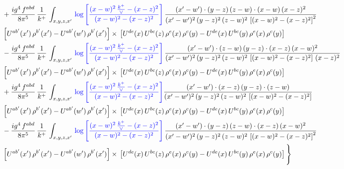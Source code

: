 \documentclass[10pt]{article}
\numberwithin{equation}{section}
\newcommand{\new}[1]{{\color{blue}#1}}
\begin{document}
\begin{align}
& +\frac{ig^{4}\, f^{abd}}{8\pi^{5}}\, \frac{1}{k^{+}}\, \int_{x,y,z,x'}\,\new{\log{\left[\frac{(x-w)^{2}\,\frac{k^{+}}{\vee}-(x-z)^{2}}{(x-w)^{2}-(x-z)^{2}}\right]}}\,\frac{(x'-w')\cdot  (y-z)\, (z-w)\cdot (x-w)\, (x-z)^{2}}{(x'-w')^{2}\, (y-z)^{2}\, (z-w)^{2}\,\left[(x-w)^{2}-(x-z)^{2}\right]^{2}}\, \notag \\ & \left[U^{ab'}(x')\,\rho^{b'}(x')-U^{ab'}(w')\, \rho^{b'}(x')\right]\times\,\left[U^{de}(x)\,U^{bc}(z)\, \rho^{e}(x)\,\rho^{c}(y)-U^{de}(x)\,U^{bc}(y)\,\rho^{e}(x)\,\rho^{c}(y)\right] \notag \\
& - \frac{ig^{4}\, f^{abd}}{8\pi^{5}}\, \frac{1}{k^{+}}\, \int_{x,y,z,x'}\,\new{\log{\left[\frac{(x-w)^{2}\,\frac{k^{+}}{\vee}-(x-z)^{2}}{(x-w)^{2}-(x-z)^{2}}\right]}}\,\frac{(x'-w')\cdot (z-w)\, (y-z)\cdot (x-z)\, (x-w)^{2}}{(x'-w')^{2}\, (y-z)^{2}\, (z-w)^{2}\,\left[(x-w)^{2} - (x-z)^{2}\right]\, (x-z)^{2}}\, \notag \\ & \left[U^{ab'}(x')\,\rho^{b'}(x')-U^{ab'}(w')\, \rho^{b'}(x')\right]\times\,\left[U^{de}(x)\,U^{bc}(z)\, \rho^{e}(x)\,\rho^{c}(y)-U^{de}(x)\,U^{bc}(y)\,\rho^{e}(x)\,\rho^{c}(y)\right] \notag \\
& +\frac{ig^{4}\, f^{abd}}{8\pi^{5}}\, \frac{1}{k^{+}}\, \int_{x,y,z,x'}\,\new{\log{\left[\frac{(x-w)^{2}\,\frac{k^{+}}{\vee}-(x-z)^{2}}{(x-w)^{2}-(x-z)^{2}}\right]}}\frac{(x'-w')\cdot (x-z)\, (y-z)\cdot (z-w)}{(x'-w')^{2}\, (y-z)^{2}\, (z-w)^{2}\,\left[(x-w)^{2} -(x-z)^{2}\right]}\, \notag \\ & \left[U^{ab'}(x')\,\rho^{b'}(x')-U^{ab'}(w')\, \rho^{b'}(x')\right]\times\,\left[U^{de}(x)\,U^{bc}(z)\, \rho^{e}(x)\,\rho^{c}(y)-U^{de}(x)\,U^{bc}(y)\,\rho^{e}(x)\,\rho^{c}(y)\right] \notag \\
& -\frac{ig^{4}\, f^{abd}}{8\pi^{5}}\, \frac{1}{k^{+}}\, \int_{x,y,z,x'}\,\new{\log{\left[\frac{(x-w)^{2}\,\frac{k^{+}}{\vee}-(x-z)^{2}}{(x-w)^{2}-(x-z)^{2}}\right]}}\,\frac{(x'-w')\cdot (y-z)\, (z-w)\cdot (x-z)\,(x-w)^{2}}{(x'-w')^{2}\, (y-z)^{2}\, (z-w)^{2}\,\left[(x-w)^{2}-(x-z)^{2}\right]^{2}}\, \notag \\ & \left[U^{ab'}(x')\,\rho^{b'}(x')-U^{ab'}(w')\, \rho^{b'}(x')\right]\times\,\left[U^{de}(x)\,U^{bc}(z)\, \rho^{e}(x)\,\rho^{c}(y)-U^{de}(x)\,U^{bc}(y)\,\rho^{e}(x)\,\rho^{c}(y)\right]\Bigg\} \label{eq:F:G1IIIN2}
\end{align}
\end{document}
